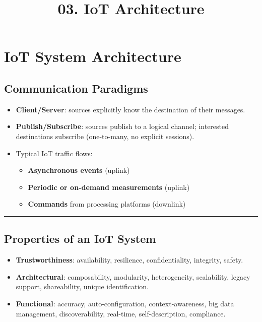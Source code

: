 \documentclass[
]{article}
\title{03. IoT Architecture}
\author{}
\date{}
\providecommand{\tightlist}{%
  \setlength{\itemsep}{0pt}\setlength{\parskip}{0pt}}
\begin{document}
\maketitle

\section{IoT System Architecture}\label{iot-system-architecture}

\subsection{Communication Paradigms}\label{communication-paradigms}

\begin{itemize}
\tightlist
\item
  \textbf{Client/Server}: sources explicitly know the destination of
  their messages.
\item
  \textbf{Publish/Subscribe}: sources publish to a logical channel;
  interested destinations subscribe (one-to-many, no explicit sessions).
\item
  Typical IoT traffic flows:

  \begin{itemize}
  \tightlist
  \item
    \textbf{Asynchronous events} (uplink)
  \item
    \textbf{Periodic or on-demand measurements} (uplink)
  \item
    \textbf{Commands} from processing platforms (downlink)
  \end{itemize}
\end{itemize}

\begin{center}\rule{0.5\linewidth}{0.5pt}\end{center}

\subsection{Properties of an IoT
System}\label{properties-of-an-iot-system}

\begin{itemize}
\tightlist
\item
  \textbf{Trustworthiness}: availability, resilience, confidentiality,
  integrity, safety.
\item
  \textbf{Architectural}: composability, modularity, heterogeneity,
  scalability, legacy support, shareability, unique identification.
\item
  \textbf{Functional}: accuracy, auto-configuration, context-awareness,
  big data management, discoverability, real-time, self-description,
  compliance.
\end{itemize}
\end{document}
